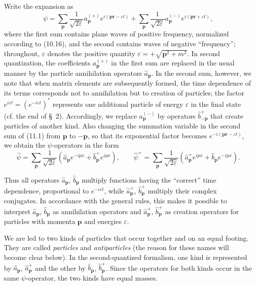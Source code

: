 Write the expansion as
\begin{equation}
\psi=\sum_{\mathbf p}\frac{1}{\sqrt{2\varepsilon}}a^{(+)}_{\mathbf p}
e^{i(\mathbf p\mathbf r-\varepsilon t)}
+\sum_{\mathbf p}\frac{1}{\sqrt{2\varepsilon}}a^{(-)}_{\mathbf p}
e^{i(\mathbf p\mathbf r+\varepsilon t)},
\tag{11.1}
\end{equation}
where the first sum contains plane waves of positive frequency, normalized according to (10.16), and the second contains waves of negative ``frequency''; throughout, $\varepsilon$ denotes the positive quantity $\varepsilon=+\sqrt{\mathbf p^2+m^2}$. In second quantization, the coefficients $a^{(+)}_{\mathbf p}$ in the first sum are replaced in the usual manner by the particle annihilation operators $\widehat a_{\mathbf p}$. In the second sum, however, we note that when matrix elements are subsequently formed, the time dependence of its terms corresponds not to annihilation but to creation of particles; the factor $e^{i\varepsilon t}=(e^{-i\varepsilon t})^*$ represents one additional particle of energy $\varepsilon$ in the final state (cf. the end of \S~2). Accordingly, we replace $a^{(-)}_{\mathbf p}$ by operators $\widehat b^+_{-\mathbf p}$ that create particles of another kind. Also changing the summation variable in the second sum of (11.1) from $\mathbf p$ to $-\mathbf p$, so that its exponential factor becomes $e^{-i(\mathbf p\mathbf r-\varepsilon t)}$, we obtain the $\psi$-operators in the form
\begin{equation}
\widehat\psi
=\sum_{\mathbf p}\frac{1}{\sqrt{2\varepsilon}}
\left(\widehat a_{\mathbf p}e^{-ipx}+\widehat b^+_{\mathbf p}e^{ipx}\right),
\qquad
\widehat\psi^+
=\sum_{\mathbf p}\frac{1}{\sqrt{2\varepsilon}}
\left(\widehat a^+_{\mathbf p}e^{ipx}+\widehat b_{\mathbf p}e^{-ipx}\right).
\tag{11.2}
\end{equation}

Thus all operators $\widehat a_{\mathbf p}$, $\widehat b_{\mathbf p}$ multiply functions having the ``correct'' time dependence, proportional to $e^{-i\varepsilon t}$, while $\widehat a^+_{\mathbf p}$, $\widehat b^+_{\mathbf p}$ multiply their complex conjugates. In accordance with the general rules, this makes it possible to interpret $\widehat a_{\mathbf p}$, $\widehat b_{\mathbf p}$ as annihilation operators and $\widehat a^+_{\mathbf p}$, $\widehat b^+_{\mathbf p}$ as creation operators for particles with momenta $\mathbf p$ and energies $\varepsilon$.

We are led to two kinds of particles that occur together and on an equal footing. They are called \emph{particles} and \emph{antiparticles} (the reason for these names will become clear below). In the second-quantized formalism, one kind is represented by $\widehat a_{\mathbf p}$, $\widehat a^+_{\mathbf p}$ and the other by $\widehat b_{\mathbf p}$, $\widehat b^+_{\mathbf p}$. Since the operators for both kinds occur in the same $\psi$-operator, the two kinds have equal masses.


